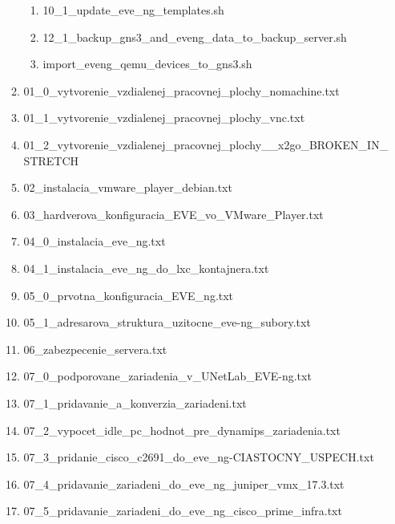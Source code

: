 \begin{enumerate}[noitemsep,label*=\thesection.\arabic*.]
\begin{enumerate}[noitemsep,label*=\arabic*.]
        \begin{enumerate}[noitemsep,label*=\arabic*.]
            \item \label{item:uprava_sablon_skript} 10\_1\_update\_eve\_ng\_templates.sh
            \item \label{item:backup_script} 12\_1\_backup\_gns3\_and\_eveng\_data\_to\_backup\_server.sh
            \item \label{item:gns3_import_skript} import\_eveng\_qemu\_devices\_to\_gns3.sh
        \end{enumerate}
        
        \item \label{item:vnc1} 01\_0\_vytvorenie\_vzdialenej\_pracovnej\_plochy\_nomachine.txt
        \item \label{item:vnc2} 01\_1\_vytvorenie\_vzdialenej\_pracovnej\_plochy\_vnc.txt
        \item \label{item:vnc3} 01\_2\_vytvorenie\_vzdialenej\_pracovnej\_plochy\_\_x2go\_BROKEN\_IN\_STRETCH
        \item \label{item:vmware_extra_instalacia} 02\_instalacia\_vmware\_player\_debian.txt
        \item 03\_hardverova\_konfiguracia\_EVE\_vo\_VMware\_Player.txt
        \item \label{item:instalacia_ubuntu_a_eve_ng} 04\_0\_instalacia\_eve\_ng.txt
        \item 04\_1\_instalacia\_eve\_ng\_do\_lxc\_kontajnera.txt
        \item \label{item:instalacia_A_konfiguracia_eve_ng} 05\_0\_prvotna\_konfiguracia\_EVE\_ng.txt
        \item \label{item:adresarova_struktura} 05\_1\_adresarova\_struktura\_uzitocne\_eve-ng\_subory.txt
        \item \label{item:zabezpecenie} 06\_zabezpecenie\_servera.txt
        \item 07\_0\_podporovane\_zariadenia\_v\_UNetLab\_EVE-ng.txt
        \item \label{item:pridavanie_konverzia_zariadeni} 07\_1\_pridavanie\_a\_konverzia\_zariadeni.txt
        \item 07\_2\_vypocet\_idle\_pc\_hodnot\_pre\_dynamips\_zariadenia.txt
        \item 07\_3\_pridanie\_cisco\_c2691\_do\_eve\_ng-CIASTOCNY\_USPECH.txt
        \item \label{item:pridavanie_juniper_vmx} 07\_4\_pridavanie\_zariadeni\_do\_eve\_ng\_juniper\_vmx\_17.3.txt
        \item 07\_5\_pridavanie\_zariadeni\_do\_eve\_ng\_cisco\_prime\_infra.txt

\end{enumerate}
\end{enumerate}
